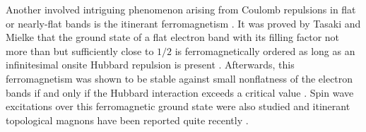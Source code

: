 \documentclass[amsmath,superscriptaddress,showpacs,aps,prb,twocolumn]{revtex4-1}
\begin{document}
\par Another involved intriguing phenomenon arising from Coulomb repulsions in flat or nearly-flat bands is the itinerant ferromagnetism \cite{T_PTP1998}. It was proved by Tasaki and Mielke that the ground state of a flat electron band with its filling factor not more than but sufficiently close to $1/2$ is ferromagnetically ordered as long as an infinitesimal onsite Hubbard repulsion is present \cite{T_PRL1992,M_PLA1993,MT_CMP1993}. Afterwards, this ferromagnetism was shown to be stable against small nonflatness of the electron bands if and only if the Hubbard interaction exceeds a critical value \cite{T_PRL1994}. Spin wave excitations over this ferromagnetic ground state were also studied \cite{KA_PRL1994,SGDL_PRB2018} and itinerant topological magnons have been reported quite recently \cite{SGDL_PRB2018}.
\end{document}
